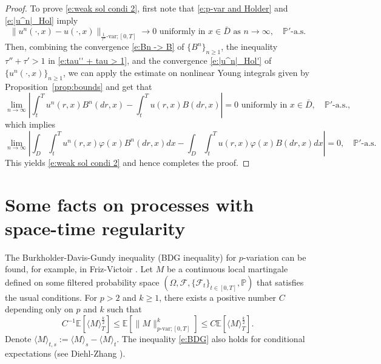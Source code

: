 \documentclass[11pt,reqno]{amsart}
\numberwithin{equation}{section}
\begin{document}
\begin{proof}
To prove  \eqref{e:weak sol condi 2}, first note that \eqref{e:p-var and Holder} and  \eqref{e:|u^n|_Hol} imply 
\begin{equation}\label{e:|u^n|_Hol'}
\|u^n(\cdot,x) - u(\cdot,x)\|_{\frac{1}{\tau''}\text{-var};[0,T]}\to 0 \text{ uniformly in } x\in \bar{D}\text{ as } n\to \infty,\quad  \mathbb{P}'\text{-a.s.}
\end{equation}
Then, combining the convergence \eqref{e:Bn -> B} of $\{B^n\}_{n\ge 1}$,  the inequality $\tau'' + \tau ' >1$ in \eqref{e:tau'' + tau > 1}, and the convergence \eqref{e:|u^n|_Hol'} of $\{u^n(\cdot,x)\}_{n\ge 1}$, we can apply the estimate on 
nonlinear Young integrals given by Proposition~\ref{prop:bounds} and get that
\begin{equation*}
\lim_{n\rightarrow \infty} \left|\int_{t}^{T}u^{n}(r,x)B^n(dr,x) - \int_{t}^{T}u(r,x)B(dr,x)\right| = 0\text{ uniformly in } x\in \bar{D} , \quad  \mathbb{P}'\text{-a.s.},
\end{equation*}
which implies 
\begin{equation*}
\lim_{n\rightarrow \infty} \left|\int_{D}\int_{t}^{T}u^{n}(r,x)\varphi(x)B^n(dr,x)dx - \int_{D}\int_{t}^{T}u(r,x)\varphi(x)B(dr,x)dx\right| = 0, \quad  \mathbb{P}'\text{-a.s.}
\end{equation*}
This yields \eqref{e:weak sol condi 2} and hence completes the proof.
\end{proof}


\appendix 	

\section{Some facts on processes with space-time regularity}\label{miscellaneous results}

The Burkholder-Davis-Gundy inequality (BDG inequality) for $p$-variation can be found, for example, in Friz-Victoir \cite[Theorem~14.12]{FrizVictoir}. Let  $M$ be a continuous local martingale defined on some filtered probability space $(\Omega,\mathcal{F},\{\mathcal{F}_{t}\}_{t\in[0,T]},\mathbb{P})$ that satisfies the usual conditions. For $p>2$ and $k\ge 1$, there exists a positive number $C$ depending only on $p$ and $k$ such that
\begin{equation}\label{e:BDG}
C^{-1}\mathbb{E}[\langle M \rangle ^{\frac{k}{2}}_{T}]\le \mathbb{E}[\|M\|^{k}_{p\text{-var};[0,T]}] \le C \mathbb{E}[\langle M \rangle ^{\frac{k}{2}}_{T}].
\end{equation}
Denote $\langle M\rangle_{t,s}:= \langle M\rangle_{s} - \langle M\rangle_{t}$. The inequality \eqref{e:BDG} also holds for  conditional expectations (see Diehl-Zhang \cite{DiehlZhang}). 
\end{document}
